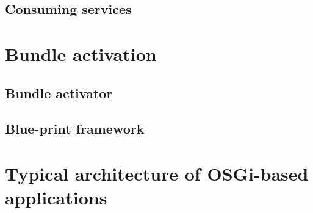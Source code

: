 \subsection{Consuming services}

\section{Bundle activation}
\subsection{Bundle activator}
\subsection{Blue-print framework}

\section{Typical architecture of OSGi-based applications}




 
